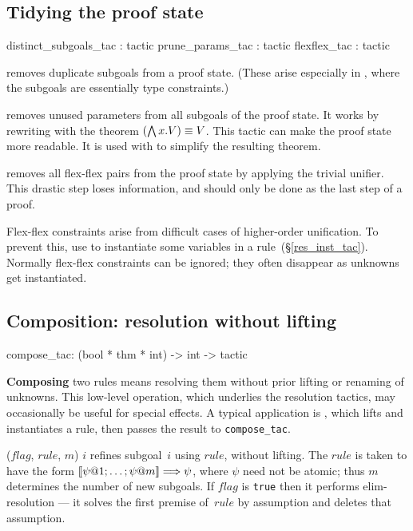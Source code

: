\subsection{Tidying the proof state}
\begin{ttbox} 
distinct_subgoals_tac : tactic
prune_params_tac      : tactic
flexflex_tac          : tactic
\end{ttbox}
\begin{ttdescription}
\item[\ttindexbold{distinct_subgoals_tac}]  
  removes duplicate subgoals from a proof state.  (These arise especially
  in \ZF{}, where the subgoals are essentially type constraints.)

\item[\ttindexbold{prune_params_tac}]  
  removes unused parameters from all subgoals of the proof state.  It works
  by rewriting with the theorem $(\bigwedge x. V)\equiv V$.  This tactic can
  make the proof state more readable.  It is used with
   to simplify the resulting theorem.

\item[\ttindexbold{flexflex_tac}]  
  removes all flex-flex pairs from the proof state by applying the trivial
  unifier.  This drastic step loses information, and should only be done as
  the last step of a proof.

  Flex-flex constraints arise from difficult cases of higher-order
  unification.  To prevent this, use  to instantiate
  some variables in a rule~({\S}\ref{res_inst_tac}).  Normally flex-flex
  constraints can be ignored; they often disappear as unknowns get
  instantiated.
\end{ttdescription}


\subsection{Composition: resolution without lifting}
\begin{ttbox}
compose_tac: (bool * thm * int) -> int -> tactic
\end{ttbox}
{\bf Composing} two rules means resolving them without prior lifting or
renaming of unknowns.  This low-level operation, which underlies the
resolution tactics, may occasionally be useful for special effects.
A typical application is , which lifts and instantiates a
rule, then passes the result to {\tt compose_tac}.
\begin{ttdescription}
\item[\ttindexbold{compose_tac} ($flag$, $rule$, $m$) $i$] 
refines subgoal~$i$ using $rule$, without lifting.  The $rule$ is taken to
have the form $\List{\psi@1; \ldots; \psi@m} \Imp \psi$, where $\psi$ need
not be atomic; thus $m$ determines the number of new subgoals.  If
$flag$ is {\tt true} then it performs elim-resolution --- it solves the
first premise of~$rule$ by assumption and deletes that assumption.
\end{ttdescription}


